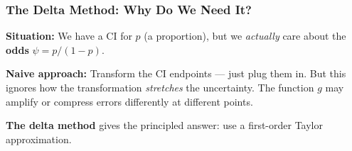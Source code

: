 \documentclass[aspectratio=169]{beamer}
\begin{document}
\begin{frame}
\frametitle{The Delta Method: Why Do We Need It?}

\small
\textbf{Situation:} We have a CI for $p$ (a proportion), but we \textit{actually} care about the \textbf{odds} $\psi = p/(1-p)$.

\vspace{0.1cm}
\pause
\textbf{Naive approach:} Transform the CI endpoints --- just plug them in. But this ignores how the transformation \textit{stretches} the uncertainty. The function $g$ may amplify or compress errors differently at different points.

\vspace{0.1cm}
\pause
\textbf{The delta method} gives the principled answer: use a first-order Taylor approximation.

\begin{center}
\end{center}
\end{frame}
\end{document}
